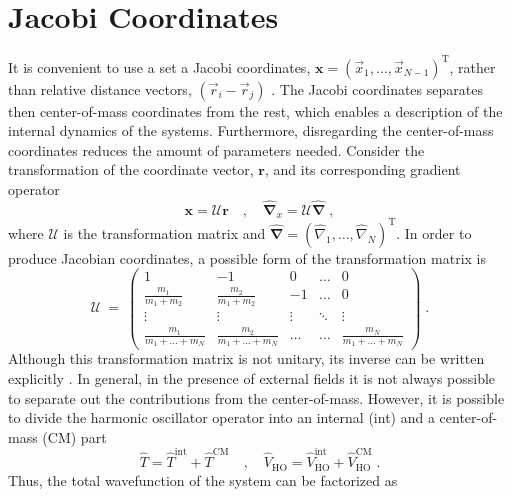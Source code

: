 \section{Jacobi Coordinates}
It is convenient to use a set a Jacobi coordinates, $\boldsymbol{x} = (\vec{x}_1 , \ldots, \vec{x}_{N-1})^{\mathrm{T}}$, rather than relative distance vectors, $(\vec{r}_i - \vec{r}_j)$ \cite{Varga1995}. The Jacobi coordinates separates then center-of-mass coordinates from the rest, which enables a description of the internal dynamics of the systems. Furthermore, disregarding the center-of-mass coordinates reduces the amount of parameters needed.
Consider the transformation of the coordinate vector, $\boldsymbol{r}$, and its corresponding gradient operator 
\begin{equation}
	\boldsymbol{x} = \mathcal{U} \boldsymbol{r} \quad , \quad \hat{\boldsymbol{\nabla}}_x = \mathcal{U} \hat{\boldsymbol{\nabla}} \; ,
\end{equation}
where $\mathcal{U}$ is the transformation matrix and $\hat{\boldsymbol{\nabla}} = \left( \hat{\nabla}_1 , \ldots , \hat{\nabla}_N \right)^{\mathrm{T}}$. 	
In order to produce Jacobian coordinates, a possible form of the transformation matrix is \cite{Mitroy2013}
\begin{equation}
 \mathcal{U} \: = \: \begin{pmatrix}
1 & -1 & 0 & \hdots & 0 \\
\frac{m_1}{m_1 + m_2} & \frac{m_2}{m_1 + m_2} & -1 & \hdots & 0 \\
\vdots & \vdots & \vdots & \ddots & \vdots \\
\frac{m_1}{m_1 + \ldots + m_N} & \frac{m_2}{m_1  + \ldots + m_N} & \hdots & \hdots & \frac{m_N}{m_1  + \ldots + m_N}
\end{pmatrix} \; .
	\label{eq:JacobiTransMatrix}
\end{equation}
Although this transformation matrix is not unitary, its inverse can be written explicitly \cite{Suzuki1998}.
In general, in the presence of external fields it is not always possible to separate out the contributions from the center-of-mass. However, it is possible to divide the harmonic oscillator operator into an internal (int) and a center-of-mass (CM) part
\begin{equation}
	\hat{T} = \hat{T}^{\mathrm{int}} + \hat{T}^{\mathrm{CM}} \quad , \quad \hat{V}_{\mathrm{HO}} = \hat{V}_{\mathrm{HO}}^{\mathrm{int}} + \hat{V}_{\mathrm{HO}}^{\mathrm{CM}} \; .
\end{equation}
Thus, the total wavefunction of the system can be factorized as  
